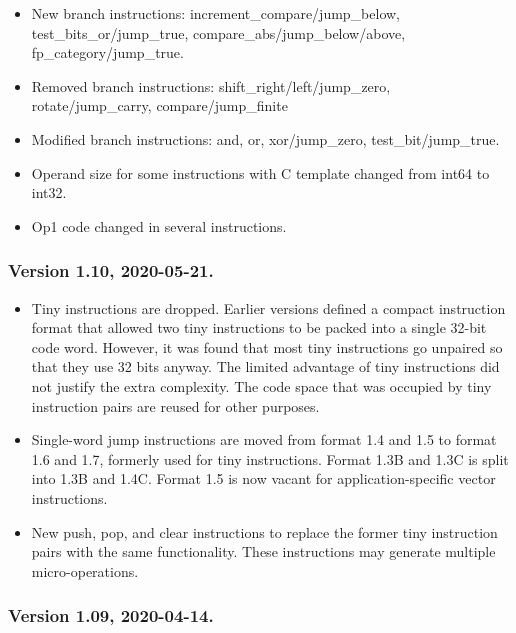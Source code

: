 \documentclass[forwardcom.tex]{subfiles}
\begin{document}
\begin{itemize}
\item New branch instructions: increment\_compare/jump\_below, test\_bits\_or/jump\_true,  
compare\_abs/jump\_below/above, fp\_category/jump\_true.

\item Removed branch instructions: shift\_right/left/jump\_zero, 
rotate/jump\_carry, compare/jump\_finite

\item Modified branch instructions: and, or, xor/jump\_zero, test\_bit/jump\_true.

\item Operand size for some instructions with C template changed from int64 to int32.

\item Op1 code changed in several instructions.

\end{itemize}


\subsubsection{Version 1.10, 2020-05-21.}

\begin{itemize}
\item Tiny instructions are dropped. Earlier versions defined a compact instruction format that allowed two tiny instructions to be packed into a single 32-bit code word. However, it was found that most tiny instructions go unpaired so that they use 32 bits anyway. The limited advantage of tiny instructions did not justify the extra complexity. The code space that was occupied by tiny instruction pairs are reused for other purposes.

\item Single-word jump instructions are moved from format 1.4 and 1.5 to format 1.6 and 1.7, formerly used for tiny instructions. Format 1.3B and 1.3C is split into 1.3B and 1.4C. Format 1.5 is now vacant for application-specific vector instructions.

\item New push, pop, and clear instructions to replace the former tiny instruction pairs with the same functionality. These instructions may generate multiple micro-operations.

\end{itemize}


\subsubsection{Version 1.09, 2020-04-14.}
\end{document}
